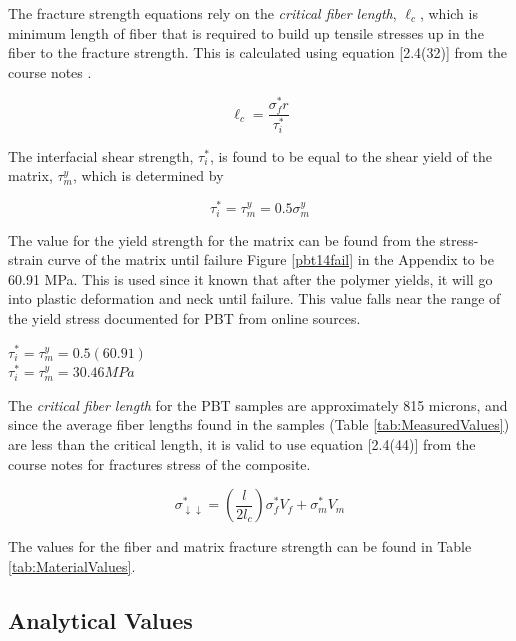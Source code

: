 \documentclass[11pt]{article}
\begin{document}
The fracture strength equations rely on the \textit{critical fiber length}, \(\ell_c\), which is minimum length of fiber that is required to build up tensile stresses up in the fiber to the fracture strength. This is calculated using equation [2.4(32)] from the course notes \cite{course_notes}.

\begin{equation}
\ell_c = \frac{\sigma^*_f r}{\tau^*_i}
\end{equation}

The interfacial shear strength, \(\tau^*_i\), is found to be equal to the shear yield of the matrix, \(\tau^y_m\), which is determined by

\begin{equation}
\tau^*_i = \tau^y_m = 0.5 \sigma^y_m
\end{equation}

The value for the yield strength for the matrix can be found from the stress-strain curve of the matrix until failure Figure \ref{pbt14fail} in the Appendix to be 60.91 MPa. This is used since it known that after the polymer yields, it will go into plastic deformation and neck until failure. This value falls near the range of the yield stress documented for PBT from online sources.

\begin{center}

\(\tau^*_i = \tau^y_m = 0.5(60.91)\)
\\
\(\tau^*_i = \tau^y_m = 30.46 MPa\)

\end{center}

The \textit{critical fiber length} for the PBT samples are approximately 815 microns, and since the average fiber lengths found in the samples (Table \ref{tab:MeasuredValues}) are less than the critical length, it is valid to use equation [2.4(44)] from the course notes \cite{course_notes} for fractures stress of the composite. 

\begin{equation} \label{eq:fracture}
\sigma^*_{\downarrow \downarrow} = \left( \frac{l}{2l_c}\right) \sigma_f^* V_f + \sigma^*_m V_m
\end{equation}

The values for the fiber and matrix fracture strength can be found in Table \ref{tab:MaterialValues}.

\subsection{Analytical Values}
\end{document}
